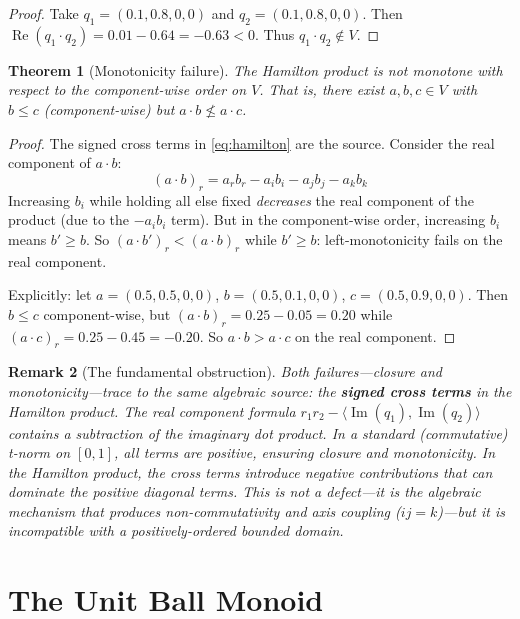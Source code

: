 \documentclass[11pt,a4paper]{article}
\newtheorem{theorem}{Theorem}
\newtheorem{remark}[theorem]{Remark}
\newcommand{\Real}{\operatorname{Re}}
\newcommand{\Imag}{\operatorname{Im}}
\begin{document}
\begin{proof}
Take $q_1 = (0.1, 0.8, 0, 0)$ and $q_2 = (0.1, 0.8, 0, 0)$.
Then $\Real(q_1 \cdot q_2) = 0.01 - 0.64 = -0.63 < 0$. Thus
$q_1 \cdot q_2 \notin V$.
\end{proof}

\begin{theorem}[Monotonicity failure]
\label{thm:monotonicity-failure}
The Hamilton product is not monotone with respect to the component-wise
order on $V$. That is, there exist $a, b, c \in V$ with $b \leq c$
(component-wise) but $a \cdot b \not\leq a \cdot c$.
\end{theorem}

\begin{proof}
The signed cross terms in \eqref{eq:hamilton} are the source. Consider
the real component of $a \cdot b$:
\[
(a \cdot b)_r = a_r b_r - a_i b_i - a_j b_j - a_k b_k
\]
Increasing $b_i$ while holding all else fixed \emph{decreases} the
real component of the product (due to the $-a_i b_i$ term). But in
the component-wise order, increasing $b_i$ means $b' \geq b$. So
$(a \cdot b')_r < (a \cdot b)_r$ while $b' \geq b$: left-monotonicity
fails on the real component.

Explicitly: let $a = (0.5, 0.5, 0, 0)$, $b = (0.5, 0.1, 0, 0)$,
$c = (0.5, 0.9, 0, 0)$. Then $b \leq c$ component-wise, but
$(a \cdot b)_r = 0.25 - 0.05 = 0.20$ while
$(a \cdot c)_r = 0.25 - 0.45 = -0.20$. So $a \cdot b > a \cdot c$
on the real component.
\end{proof}

\begin{remark}[The fundamental obstruction]
\label{rem:obstruction}
Both failures---closure and monotonicity---trace to the same algebraic
source: the \textbf{signed cross terms} in the Hamilton product. The
real component formula
$r_1 r_2 - \langle \Imag(q_1), \Imag(q_2) \rangle$ contains a
subtraction of the imaginary dot product. In a standard (commutative)
t-norm on $[0,1]$, all terms are positive, ensuring closure and
monotonicity. In the Hamilton product, the cross terms introduce
\emph{negative contributions} that can dominate the positive diagonal
terms. This is not a defect---it is the algebraic mechanism that
produces non-commutativity and axis coupling ($ij = k$)---but it is
incompatible with a positively-ordered bounded domain.
\end{remark}

\section{The Unit Ball Monoid}
\label{sec:ball}
\end{document}
